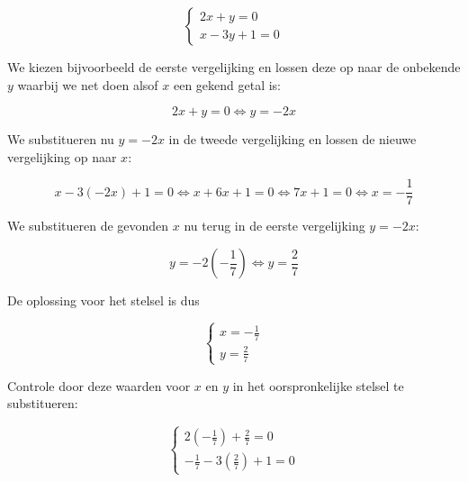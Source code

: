 \begin{voorbeeld}
	
\[\left\{ \begin{array}{l}
2x+y=0 \\
x-3y+1=0
\end{array} \right.\]

We kiezen bijvoorbeeld de eerste vergelijking en lossen deze op naar de onbekende $y$ waarbij we net doen alsof $x$ een gekend getal is:

\[ 2x+y=0 \Leftrightarrow y=-2x \]

We substitueren nu $y=-2x$ in de tweede vergelijking en lossen de nieuwe vergelijking op naar $x$:

\[ x-3(-2x)+1=0 \Leftrightarrow x+6x+1=0 \Leftrightarrow 7x+1=0 \Leftrightarrow x=-\frac{1}{7} \]

We substitueren de gevonden $x$ nu terug in de eerste vergelijking $y=-2x$:

\[ y=-2(-\frac{1}{7}) \Leftrightarrow y=\frac{2}{7} \]

De oplossing voor het stelsel is dus

\[ \left\{ \begin{array}{l}
x=-\frac{1}{7} \\
y=\frac{2}{7}
\end{array} \right. \]

Controle door deze waarden voor $x$ en $y$ in het oorspronkelijke stelsel te substitueren:

\[ \left\{ \begin{array}{l}
2(-\frac{1}{7})+\frac{2}{7}=0 \\
-\frac{1}{7}-3(\frac{2}{7})+1=0
\end{array} \right.\]

\end{voorbeeld}

